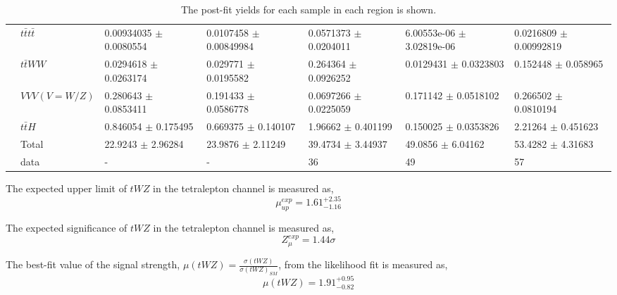 \begin{table}[h!]
{\begin{tabular}{|l|l|l|l|l|l|l|}
                        & $t\bar{t}t\bar{t}$          & 0.00934035 $\pm$ 0.0080554    & 0.0107458 $\pm$ 0.00849984  & 0.0571373 $\pm$ 0.0204011     & 6.00553e-06 $\pm$ 3.02819e-06 & 0.0216809 $\pm$ 0.00992819 \\
                        & $t\bar{t}WW$          & 0.0294618 $\pm$ 0.0263174     & 0.029771 $\pm$ 0.0195582    & 0.264364 $\pm$ 0.0926252      & 0.0129431 $\pm$ 0.0323803     & 0.152448 $\pm$ 0.058965    \\
                        & $VVV (V = W/Z)$          & 0.280643 $\pm$ 0.0853411      & 0.191433 $\pm$ 0.0586778    & 0.0697266 $\pm$ 0.0225059     & 0.171142 $\pm$ 0.0518102      & 0.266502 $\pm$ 0.0810194   \\
                        & $t\bar{t}H$           & 0.846054 $\pm$ 0.175495       & 0.669375 $\pm$ 0.140107     & 1.96662 $\pm$ 0.401199        & 0.150025 $\pm$ 0.0353826      & 2.21264 $\pm$ 0.451623     \\\hline
                        & Total         & 22.9243 $\pm$ 2.96284         & 23.9876 $\pm$ 2.11249       & 39.4734 $\pm$ 3.44937         & 49.0856 $\pm$ 6.04162         & 53.4282 $\pm$ 4.31683      \\ \hline
                        & data          & -                                         & -                                      & 36                                         & 49                                         & 57                                      \\ \hline
\end{tabular}}
\caption{The post-fit yields for each sample in each region is shown.}
\label{tab:4Lep-PostFit-Yields}
\end{table}

The expected upper limit of $tWZ$ in the tetralepton channel is measured as,
\begin{equation}
  \mu_{up}^{exp} =   1.61^{+2.35}_{-1.16}
\end{equation}

The expected significance of $tWZ$ in the tetralepton channel is measured as,
\begin{equation}
 Z_{\mu}^{exp} =   1.44\sigma
\end{equation}

The best-fit value of the signal strength, $\mu (tWZ)= \frac{\sigma(tWZ)}{\sigma(tWZ)_{SM}}$, from the likelihood fit is measured as,
\begin{equation}
  \mu (tWZ) =   1.91^{+0.95}_{-0.82}
\end{equation}

